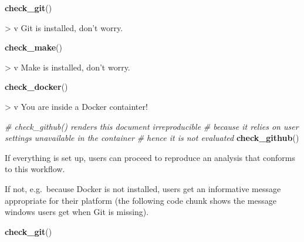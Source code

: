 \documentclass[12pt,a4paper,twoside]{article}
\newenvironment{Shaded}{\begin{snugshade}}{\end{snugshade}}
\newcommand{\CommentTok}[1]{\textcolor[rgb]{0.56,0.35,0.01}{\textit{#1}}}
\newcommand{\KeywordTok}[1]{\textcolor[rgb]{0.13,0.29,0.53}{\textbf{#1}}}
\newcommand{\NormalTok}[1]{#1}
\let\oldverbatim\verbatim
\let\endoldverbatim\endverbatim
\renewenvironment{verbatim}{\footnotesize\oldverbatim}{\endoldverbatim}
\begin{document}
\begin{Shaded}
\begin{Highlighting}[]
\KeywordTok{check_git}\NormalTok{()}
\end{Highlighting}
\end{Shaded}

\begin{verbatim}
> v Git is installed, don't worry.
\end{verbatim}

\begin{Shaded}
\begin{Highlighting}[]
\KeywordTok{check_make}\NormalTok{()}
\end{Highlighting}
\end{Shaded}

\begin{verbatim}
> v Make is installed, don't worry.
\end{verbatim}

\begin{Shaded}
\begin{Highlighting}[]
\KeywordTok{check_docker}\NormalTok{()}
\end{Highlighting}
\end{Shaded}

\begin{verbatim}
> v You are inside a Docker containter!
\end{verbatim}

\begin{Shaded}
\begin{Highlighting}[]
\CommentTok{# check_github() renders this document irreproducible}
\CommentTok{# because it relies on user settings unavailable in the container}
\CommentTok{# hence it is not evaluated}
\KeywordTok{check_github}\NormalTok{()}
\end{Highlighting}
\end{Shaded}

If everything is set up, users can proceed to reproduce an analysis that conforms to this workflow.

If not, e.g.~because Docker is not installed, users get an informative message appropriate for their platform (the following code chunk shows the message windows users get when Git is missing).

\begin{Shaded}
\begin{Highlighting}[]
\KeywordTok{check_git}\NormalTok{()}
\end{Highlighting}
\end{Shaded}
\end{document}
